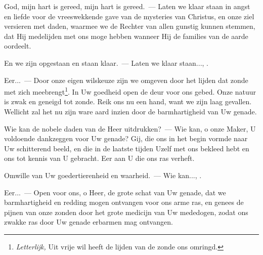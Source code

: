 \documentclass[12pt,twoside,a5paper]{article}
\begin{document}
\begin{halfparskip}
   God, mijn hart is gereed, mijn hart is gereed.~--- Laten we klaar staan in angst en liefde voor de vreeswekkende gave van de mysteries van Christus, en onze ziel versieren met daden, waarmee we de Rechter van allen gunstig kunnen stemmen, dat Hij medelijden met ons moge hebben wanneer Hij de families
  van de aarde oordeelt.

  En we zijn opgestaan en staan klaar.~--- Laten we klaar staan..., .

  Eer...~--- Door onze eigen wilskeuze zijn we omgeven door het lijden dat zonde met zich meebrengt\footnote{\emph{Letterlijk,} Uit vrije wil heeft de lijden van de zonde ons omringd.}. In Uw goedheid open de deur voor ons gebed. Onze natuur is zwak en geneigd tot zonde. Reik ons nu een hand, want we zijn laag gevallen. Wellicht zal het nu zijn ware aard inzien door de barmhartigheid van Uw genade.
\end{halfparskip}

\begin{halfparskip}
   Wie kan de nobele daden van de Heer uitdrukken?~--- Wie kan, o onze Maker, U voldoende dankzeggen voor Uw genade? Gij, die ons in het begin vormde naar Uw schitterend beeld, en die in de laatste tijden Uzelf met ons bekleed hebt en ons tot kennis van U gebracht. Eer aan U die ons ras verheft.

  Omwille van Uw goedertierenheid en waarheid.~--- Wie kan..., .

  Eer...~--- Open voor ons, o Heer, de grote schat van Uw genade, dat we barmhartigheid en redding mogen ontvangen voor ons arme ras, en genees de pijnen van onze zonden door het grote medicijn van Uw mededogen, zodat ons zwakke ras door Uw genade erbarmen mag ontvangen.
\end{halfparskip}
\end{document}
